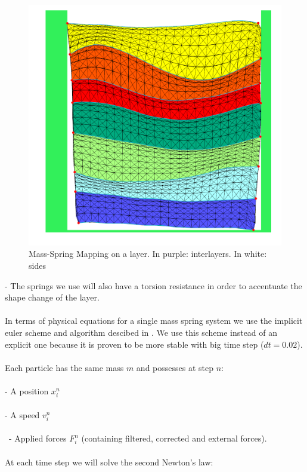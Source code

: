 \documentclass[12pt, a4paper]{memoir} %
\begin{document}
	\begin{figure}[H]
	\centering
	\includegraphics[scale=0.5]{springMapping.png}
	\caption{Mass-Spring Mapping on a layer. In purple: interlayers. In white: sides}
	\end{figure}
	
	
\indent	- The springs we use will also have a torsion resistance in order to accentuate the shape change of the layer.\\\\
In terms of physical equations for a single mass spring system we use the implicit euler scheme and algorithm descibed in \citep{caltech}. We use this scheme instead of an explicit one because it is proven to be more stable with big time step ($dt = 0.02$).\\\\ 
Each particle has the same mass $m$ and possesses at step $n$:\\\\
\indent	- A position  $x_i^n$\\\\
\indent	- A speed $v_i^n$ \\\\\
\indent	- Applied forces $F_i^n$ (containing filtered, corrected and external forces).\\\\
At each time step we will solve the second Newton's law:\\
\end{document}
